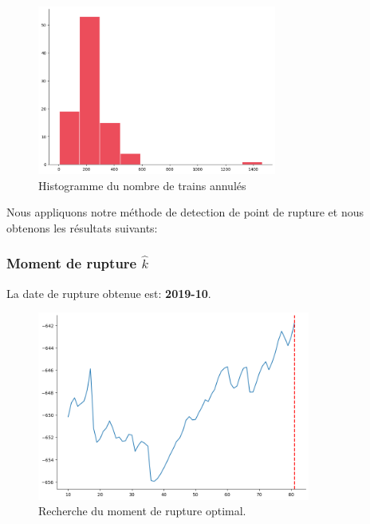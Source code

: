 {\begin{figure}[H]
  \centering
  \includegraphics[width=0.7\textwidth]{image/AQ-FIG8.png}
  \caption{Histogramme du nombre de trains annulés}
\end{figure}

Nous appliquons notre méthode de detection de point de rupture et nous obtenons les résultats suivants:

\subsubsection{Moment de rupture $\hat{k}$}

La date de rupture obtenue est: \textbf{2019-10}. 


\begin{figure}[H]
\centering
\includegraphics[width=0.8\textwidth]{image/AQ-FIG9.png} 
\caption{Recherche du moment de rupture optimal.}
\label{fig:trains_ANNULES_2}
\end{figure}


}
